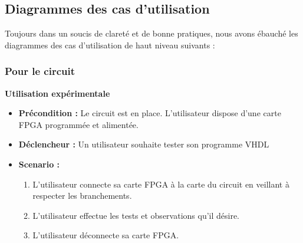 \subsection{Diagrammes des cas d'utilisation}

Toujours dans un soucis de clareté et de bonne pratiques, nous avons ébauché les diagrammes des cas d'utilisation de haut niveau suivants :

	\subsubsection{Pour le circuit}


		\textbf{Utilisation expérimentale}
		\begin{itemize}
			\item \textbf{Précondition :} Le circuit est en place. L'utilisateur dispose d'une carte FPGA programmée et alimentée.
			\item \textbf{Déclencheur :} Un utilisateur souhaite tester son programme VHDL
			\item \textbf{Scenario :}
			\begin{enumerate}
				\item L'utilisateur connecte sa carte FPGA à la carte du circuit en veillant à respecter les branchements.
				\item L'utilisateur effectue les tests et observations qu'il désire.
				\item L'utilisateur déconnecte sa carte FPGA.
			\end{enumerate}
		\end{itemize}
		\newpage

